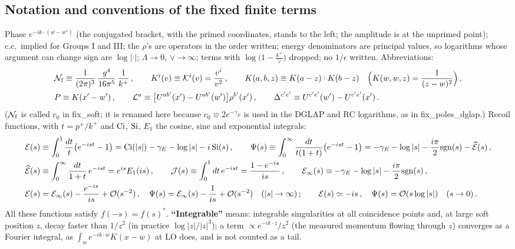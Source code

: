 {\color{red}
\subsection*{Notation and conventions of the fixed finite terms}
 Phase $e^{-ik\cdot(w-w')}$ (the conjugated bracket, with the primed coordinates, stands to the left; the amplitude is at the unprimed point); c.c.\ implied for Groups I and III; the $\rho$'s are operators in the order written; energy denominators are principal values, so logarithms whose argument can change sign are $\log|\cdot|$; $\Lambda\to0$, $\vee\to\infty$; terms with $\log\big(1-\frac{k^{+}}{\vee}\big)$ dropped; no $1/\epsilon$ written. Abbreviations:
\begin{align}
&\mathcal{N}_{\rm f}\equiv\frac{1}{(2\pi)^{3}}\,\frac{g^{4}}{16\pi^{5}}\,\frac{1}{k^{+}}\,,\qquad K^{i}(v)\equiv\mathcal{K}^{i}(v)=\frac{v^{i}}{v^{2}}\,,\qquad K(a,b,z)\equiv K(a-z)\cdot K(b-z)\quad\Big(K(w,w,z)=\frac{1}{(z-w)^{2}}\Big)\,,\notag\\&P\equiv K(x'-w')\,,\qquad \mathcal{L}^{a}\equiv\big[U^{ab'}(x')-U^{ab'}(w')\big]\rho^{b'}(x')\,,\qquad \Delta^{c'e'}\equiv U^{c'e'}(w')-U^{c'e'}(x')\,.\notag
\end{align}
($\mathcal{N}_{\rm f}$ is called $c_{0}$ in fix\_soft; it is renamed here because $c_{0}\equiv2e^{-\gamma_{E}}$ is used in the DGLAP and RC logarithms, as in fix\_poles\_dglap.) Recoil functions, with $t=p^{+}/k^{+}$ and ${\rm Ci}$, ${\rm Si}$, $E_{1}$ the cosine, sine and exponential integrals:
\begin{align}
\mathcal{E}(s)&\equiv\int_{0}^{1}\frac{dt}{t}\big(e^{-ist}-1\big)=\mathrm{Ci}(|s|)-\gamma_{E}-\log|s|-i\,\mathrm{Si}(s)\,,\qquad
\Psi(s)\equiv\int_{0}^{\infty}\frac{dt}{t(1+t)}\big(e^{-ist}-1\big)=-\gamma_{E}-\log|s|-\frac{i\pi}{2}{\rm sgn}(s)-\widehat{\mathcal{E}}(s)\,,\notag\\
\widehat{\mathcal{E}}(s)&\equiv\int_{0}^{\infty}\frac{dt}{1+t}\,e^{-ist}=e^{is}E_{1}(is)\,,\qquad \mathcal{J}(s)\equiv\int_{0}^{1}dt\,e^{-ist}=\frac{1-e^{-is}}{is}\,,\qquad
\mathcal{E}_{\infty}(s)\equiv-\gamma_{E}-\log|s|-\frac{i\pi}{2}{\rm sgn}(s)\,,\label{eq:fx-fun}\\
\mathcal{E}(s)&=\mathcal{E}_{\infty}(s)-\frac{e^{-is}}{is}+{\cal O}(s^{-2})\,,\quad \Psi(s)=\mathcal{E}_{\infty}(s)-\frac{1}{is}+{\cal O}(s^{-2})\quad(|s|\to\infty)\,;\qquad \mathcal{E}(s)\simeq-is\,,\quad \Psi(s)={\cal O}(s\log|s|)\quad(s\to0)\,.\notag
\end{align}
All these functions satisfy $f(-s)=f(s)^{*}$. \textbf{``Integrable''} means: integrable singularities at all coincidence points and, at large soft position $z$, decay faster than $1/z^{2}$ (in practice $\log|z|/|z|^{3}$); a term $\propto e^{-ik\cdot z}/z^{2}$ (the measured momentum flowing through $z$) converges as a Fourier integral, as $\int_{w}e^{-ik\cdot w}K(x-w)$ at LO does, and is not counted as a tail.

}
